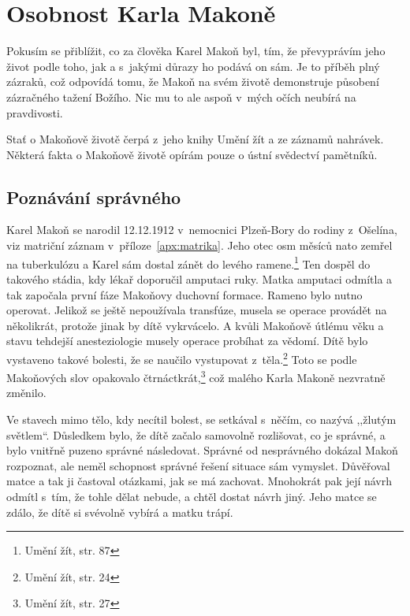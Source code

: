 \chapter{Osobnost Karla Makoně}


Pokusím se přiblížit, co za člověka Karel Makoň byl, tím, že převyprávím jeho
život podle toho, jak a s~jakými důrazy ho podává on sám. Je to příběh plný
zázraků, což odpovídá tomu, že Makoň na svém životě demonstruje působení
zázračného tažení Božího. Nic mu to ale aspoň v~mých očích neubírá na
pravdivosti.

Stať o Makoňově životě čerpá z~jeho knihy Umění žít\cite{KaMaUZ} a ze záznamů nahrávek.
Některá fakta o Makoňově životě opírám pouze o ústní svědectví pamětníků.

\section{Poznávání správného}

Karel Makoň se narodil 12.12.1912 v~nemocnici Plzeň-Bory do rodiny z~Ošelína,
viz matriční záznam v~příloze~\ref{apx:matrika}. Jeho otec osm měsíců
nato zemřel na tuberkulózu a Karel sám dostal zánět do levého ramene.\footnote{Umění žít, str. 87} Ten dospěl
do takového stádia, kdy lékař doporučil amputaci ruky. Matka amputaci odmítla a tak
započala první fáze Makoňovy duchovní formace. Rameno bylo nutno operovat.
Jelikož se ještě nepoužívala transfúze, musela se operace provádět na
několikrát, protože jinak by dítě vykrvácelo. A kvůli Makoňově útlému věku a
stavu tehdejší anesteziologie musely operace probíhat za vědomí. Dítě bylo
vystaveno takové bolesti, že se naučilo vystupovat z~těla.\footnote{Umění žít,
str. 24} Toto se podle
Makoňových slov opakovalo čtrnáctkrát,\footnote{Umění žít, str. 27} což malého Karla Makoně nezvratně
změnilo.

Ve stavech mimo tělo, kdy necítil bolest, se setkával s~něčím, co nazývá
,,žlutým světlem``.  Důsledkem bylo, že dítě začalo samovolně rozlišovat, co je
  správné, a bylo vnitřně puzeno správné následovat. Správné od nesprávného dokázal
Makoň rozpoznat, ale neměl schopnost správné řešení situace sám
vymyslet. Důvěřoval
matce a tak ji častoval otázkami, jak se má zachovat. Mnohokrát pak její návrh
odmítl s~tím, že tohle dělat nebude, a chtěl dostat návrh jiný. Jeho
matce se zdálo, že dítě si svévolně vybírá a matku trápí.

